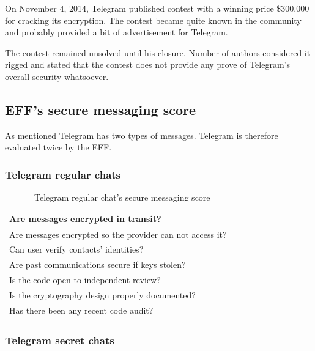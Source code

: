 \documentclass[thesis=M,english]{FITthesis}[2012/10/20]
\newcommand{\cmark}{\ding{51}}%
\newcommand{\xmark}{\ding{55}}%
\begin{document}
On November 4, 2014, Telegram published contest with a winning price \$300,000 for cracking its encryption. The contest became quite known in the community and probably provided a bit of advertisement for Telegram.

The contest remained unsolved until his closure. Number of authors considered it rigged and stated that the contest does not provide any prove of Telegram's overall security whatsoever.\cite{telegramcontestfail}\cite{telegramcontestfail2}

\subsection{EFF's secure messaging score}

As mentioned Telegram has two types of messages. Telegram is therefore evaluated twice by the EFF.

\subsubsection{Telegram regular chats}

\begin{table}[htb]
	\centering
	\caption{Telegram regular chat's secure messaging score}
	\label{tab:telegram-regular-eff}
	\begin{tabular}{|l|l|}
		\hline
		Are messages encrypted in transit? & \cmark \\\hline
		Are messages encrypted so the provider can not access it? & \xmark \\ \hline
		Can user verify contacts' identities? & \xmark \\ \hline
		Are past communications secure if keys stolen? & \xmark \\ \hline
		Is the code open to independent review? & \xmark \\ \hline
		Is the cryptography design properly documented? & \cmark \\ \hline
		Has there been any recent code audit? & \cmark \\ \hline
	\end{tabular}
\end{table}


\subsubsection{Telegram secret chats}
\end{document}

